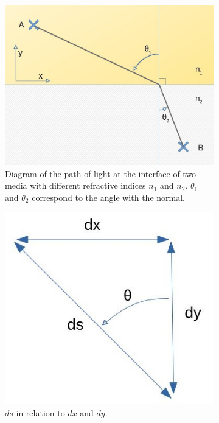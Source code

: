 \documentclass{article}
\begin{document}
\begin{figure}[h!]
\centering
  \begin{subfigure}[b]{0.6\textwidth}
    \includegraphics[width=\textwidth]{afbeeldingen/snell_analytical.jpg}
	\caption{Diagram of the path of light at the interface of two media with different refractive indices $n_1$ and $n_2$. $\theta _1$ and $\theta _2$ correspond to the angle with the normal.}
	\label{fig_snell_analytical}
  \end{subfigure}
  \begin{subfigure}[b]{0.2\textwidth}
    \includegraphics[width=\textwidth]{afbeeldingen/ds.jpg}
	\caption{$ds$ in relation to $dx$ and $dy$.}
	\label{fig_ds}
  \end{subfigure}
  \caption{}
\end{figure}
\end{document}
